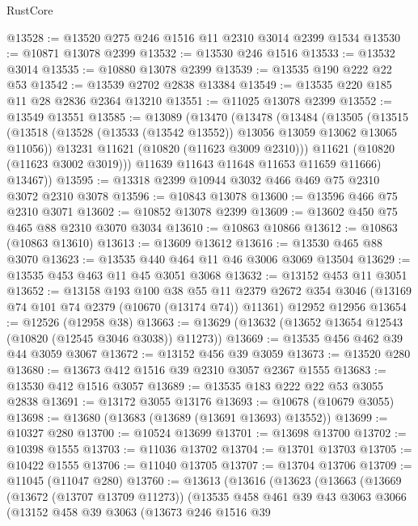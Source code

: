 \begin{lexlean}{RustCore}
\begin{coremodule}
@13528 := @13520 @275 @246 @1516 @11 @2310 @3014 @2399 @1534
@13530 := @10871 @13078 @2399
@13532 := @13530 @246 @1516
@13533 := @13532 @3014
@13535 := @10880 @13078 @2399
@13539 := @13535 @190 @222 @22 @53
@13542 := @13539 @2702 @2838 @13384
@13549 := @13535 @220 @185 @11 @28 @2836 @2364 @13210
@13551 := @11025 @13078 @2399
@13552 := @13549 @13551
@13585 := @13089
    (@13470
      (@13478
        (@13484
          (@13505
            (@13515
              (@13518 (@13528 (@13533 (@13542 @13552)) @13056 @13059 @13062 @13065 @11056))
              @13231
              @11621
              (@10820 (@11623 @3009 @2310)))
            @11621
            (@10820 (@11623 @3002 @3019)))
          @11639
          @11643
          @11648
          @11653
          @11659
          @11666)
        @13467))
@13595 := @13318 @2399 @10944 @3032 @466 @469 @75 @2310 @3072 @2310 @3078
@13596 := @10843 @13078
@13600 := @13596 @466 @75 @2310 @3071
@13602 := @10852 @13078 @2399
@13609 := @13602 @450 @75 @465 @88 @2310 @3070 @3034
@13610 := @10863 @10866
@13612 := @10863 (@10863 @13610)
@13613 := @13609 @13612
@13616 := @13530 @465 @88 @3070
@13623 := @13535 @440 @464 @11 @46 @3006 @3069 @13504
@13629 := @13535 @453 @463 @11 @45 @3051 @3068
@13632 := @13152 @453 @11 @3051
@13652 := @13158
    @193
    @100
    @38
    @55
    @11
    @2379
    @2672
    @354
    @3046
    (@13169 @74 @101 @74 @2379 (@10670 (@13174 @74)) @11361)
    @12952
    @12956
@13654 := @12526 (@12958 @38)
@13663 := @13629 (@13632 (@13652 @13654 @12543 (@10820 (@12545 @3046 @3038)) @11273))
@13669 := @13535 @456 @462 @39 @44 @3059 @3067
@13672 := @13152 @456 @39 @3059
@13673 := @13520 @280
@13680 := @13673 @412 @1516 @39 @2310 @3057 @2367 @1555
@13683 := @13530 @412 @1516 @3057
@13689 := @13535 @183 @222 @22 @53 @3055 @2838
@13691 := @13172 @3055 @13176
@13693 := @10678 (@10679 @3055)
@13698 := @13680 (@13683 (@13689 (@13691 @13693) @13552))
@13699 := @10327 @280
@13700 := @10524 @13699
@13701 := @13698 @13700
@13702 := @10398 @1555
@13703 := @11036 @13702
@13704 := @13701 @13703
@13705 := @10422 @1555
@13706 := @11040 @13705
@13707 := @13704 @13706
@13709 := @11045 (@11047 @280)
@13760 := @13613
    (@13616
      (@13623
        (@13663
          (@13669
            (@13672 (@13707 @13709 @11273))
            (@13535
              @458
              @461
              @39
              @43
              @3063
              @3066
              (@13152
                @458
                @39
                @3063
                (@13673
                  @246
                  @1516
                  @39

\end{coremodule}
\end{lexlean}
